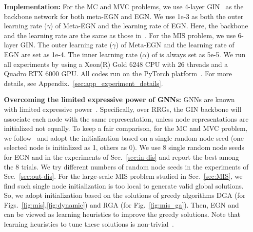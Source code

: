 \textbf{Implementation:}
For the MC and MVC problems, we use 4-layer GIN~\citep{xu2018powerful} as the backbone network for both meta-EGN and EGN. We use 1e-3 as both the outer learning rate ($\gamma$) of Meta-EGN and the learning rate of EGN. Here, the backbone and the learning rate are the same as those in~\citep{karalias2020erdos}. For the MIS problem, we use $6$-layer GIN. The outer learning rate  ($\gamma$) of Meta-EGN and the learning rate of EGN are set as 1e-4. The inner learning rate ($\alpha$) of \proj is always set as 5e-5. We run all experiments by using a Xeon(R) Gold 6248 CPU with 26 threads and a Quadro RTX $6000$ GPU. All codes run on the PyTorch platform~\citep{NEURIPS2019_9015}. For more details, see Appendix.~\ref{sec:app_experiment_details}.

\textbf{Overcoming the limited expressive power of GNNs:} GNNs are known with limited expressive power~\citep{xu2018powerful,morris2019weisfeiler}. Specifically, over RRGs, the GIN backbone will associate each node with the same representation, unless node representations are initialized not equally. To keep a fair comparison, for the MC and MVC problem, we follow~\cite{karalias2020erdos} and adopt the initialization based on a single random node seed (one selected node is initialized as 1, others as 0). We use 8 single random node seeds for EGN and \proj in the experiments of Sec.~\ref{sec:in-dis} and report the best among the 8 trials. We try different numbers of random node seeds in the experiments of  Sec.~\ref{sec:out-dis}. For the large-scale MIS problem studied in Sec.~\ref{sec:MIS}, we find such single node initialization is too local to generate valid global solutions. So, we adopt initialization based on the solutions of greedy algorithms DGA (for Figs.~\ref{fig:mis},\ref{fig:dynamic}) and RGA (for Fig.~\ref{fig:mis_ga}). Then, EGN and \proj can be viewed as learning heuristics to improve the greedy solutions. Note that learning heuristics to tune these solutions is non-trivial~\citep{andrade2012fast,rahman2017local}. %





